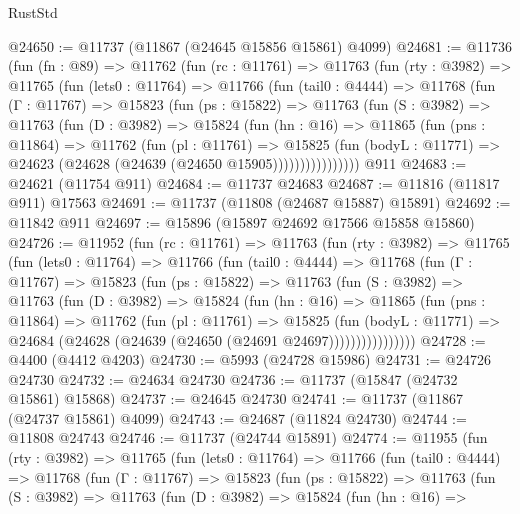 \begin{lexlean}{RustStd}
\begin{coremodule}
@24650 := @11737 (@11867 (@24645 @15856 @15861) @4099)
@24681 := @11736
    (fun (fn : @89) =>
    @11762
      (fun (rc : @11761) =>
      @11763
        (fun (rty : @3982) =>
        @11765
          (fun (lets0 : @11764) =>
          @11766
            (fun (tail0 : @4444) =>
            @11768
              (fun (Γ : @11767) =>
              @15823
                (fun (ps : @15822) =>
                @11763
                  (fun (S : @3982) =>
                  @11763
                    (fun (D : @3982) =>
                    @15824
                      (fun (hn : @16) =>
                      @11865
                        (fun (pns : @11864) =>
                        @11762
                          (fun (pl : @11761) =>
                          @15825
                            (fun (bodyL : @11771) =>
                            @24623 (@24628 (@24639 (@24650 @15905))))))))))))))))
    @911
@24683 := @24621 (@11754 @911)
@24684 := @11737 @24683
@24687 := @11816 (@11817 @911) @17563
@24691 := @11737 (@11808 (@24687 @15887) @15891)
@24692 := @11842 @911
@24697 := @15896 (@15897 @24692 @17566 @15858 @15860)
@24726 := @11952
    (fun (rc : @11761) =>
    @11763
      (fun (rty : @3982) =>
      @11765
        (fun (lets0 : @11764) =>
        @11766
          (fun (tail0 : @4444) =>
          @11768
            (fun (Γ : @11767) =>
            @15823
              (fun (ps : @15822) =>
              @11763
                (fun (S : @3982) =>
                @11763
                  (fun (D : @3982) =>
                  @15824
                    (fun (hn : @16) =>
                    @11865
                      (fun (pns : @11864) =>
                      @11762
                        (fun (pl : @11761) =>
                        @15825
                          (fun (bodyL : @11771) =>
                          @24684 (@24628 (@24639 (@24650 (@24691 @24697))))))))))))))))
@24728 := @4400 (@4412 @4203)
@24730 := @5993 (@24728 @15986)
@24731 := @24726 @24730
@24732 := @24634 @24730
@24736 := @11737 (@15847 (@24732 @15861) @15868)
@24737 := @24645 @24730
@24741 := @11737 (@11867 (@24737 @15861) @4099)
@24743 := @24687 (@11824 @24730)
@24744 := @11808 @24743
@24746 := @11737 (@24744 @15891)
@24774 := @11955
    (fun (rty : @3982) =>
    @11765
      (fun (lets0 : @11764) =>
      @11766
        (fun (tail0 : @4444) =>
        @11768
          (fun (Γ : @11767) =>
          @15823
            (fun (ps : @15822) =>
            @11763
              (fun (S : @3982) =>
              @11763
                (fun (D : @3982) =>
                @15824
                  (fun (hn : @16) =>

\end{coremodule}
\end{lexlean}
